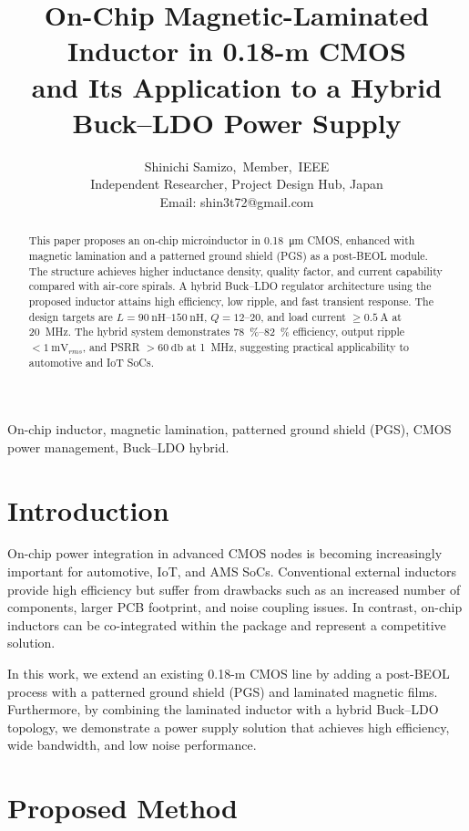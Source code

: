 \documentclass[journal]{IEEEtran}
\title{On-Chip Magnetic-Laminated Inductor in 0.18-\textmu m CMOS\\
and Its Application to a Hybrid Buck--LDO Power Supply}
\author{Shinichi Samizo,~Member,~IEEE\\
Independent Researcher, Project Design Hub, Japan\\
Email: shin3t72@gmail.com}
\begin{document}
\maketitle

\begin{abstract}
This paper proposes an on-chip microinductor in \SI{0.18}{\um} CMOS, enhanced with magnetic lamination and a patterned ground shield (PGS) as a post-BEOL module. The structure achieves higher inductance density, quality factor, and current capability compared with air-core spirals. A hybrid Buck--LDO regulator architecture using the proposed inductor attains high efficiency, low ripple, and fast transient response. The design targets are $L=\SIrange{90}{150}{\nano\henry}$, $Q=\numrange{12}{20}$, and load current $\ge\SI{0.5}{\ampere}$ at \SI{20}{\mega\hertz}. The hybrid system demonstrates \SIrange{78}{82}{\percent} efficiency, output ripple $<\SI{1}{\milli\volt_{rms}}$, and PSRR $>\SI{60}{\decibel}$ at \SI{1}{\mega\hertz}, suggesting practical applicability to automotive and IoT SoCs.
\end{abstract}

\begin{IEEEkeywords}
On-chip inductor, magnetic lamination, patterned ground shield (PGS), CMOS power management, Buck--LDO hybrid.
\end{IEEEkeywords}

\section{Introduction}
On-chip power integration in advanced CMOS nodes is becoming increasingly important for automotive, IoT, and AMS SoCs. 
Conventional external inductors provide high efficiency but suffer from drawbacks such as an increased number of components, larger PCB footprint, and noise coupling issues. 
In contrast, on-chip inductors can be co-integrated within the package and represent a competitive solution. 

In this work, we extend an existing 0.18-\textmu m CMOS line by adding a post-BEOL process with a patterned ground shield (PGS) and laminated magnetic films. 
Furthermore, by combining the laminated inductor with a hybrid Buck--LDO topology, we demonstrate a power supply solution that achieves high efficiency, wide bandwidth, and low noise performance.

\section{Proposed Method}
\end{document}
